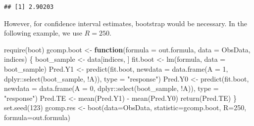 \documentclass[
]{book}
\newenvironment{Shaded}{\begin{snugshade}}{\end{snugshade}}
\newcommand{\AttributeTok}[1]{\textcolor[rgb]{0.77,0.63,0.00}{#1}}
\newcommand{\ControlFlowTok}[1]{\textcolor[rgb]{0.13,0.29,0.53}{\textbf{#1}}}
\newcommand{\DecValTok}[1]{\textcolor[rgb]{0.00,0.00,0.81}{#1}}
\newcommand{\FunctionTok}[1]{\textcolor[rgb]{0.00,0.00,0.00}{#1}}
\newcommand{\NormalTok}[1]{#1}
\newcommand{\OtherTok}[1]{\textcolor[rgb]{0.56,0.35,0.01}{#1}}
\newcommand{\SpecialCharTok}[1]{\textcolor[rgb]{0.00,0.00,0.00}{#1}}
\newcommand{\StringTok}[1]{\textcolor[rgb]{0.31,0.60,0.02}{#1}}
\begin{document}
\begin{Shaded}
\end{Shaded}

\begin{verbatim}
## [1] 2.90203
\end{verbatim}

However, for confidence interval estimates, bootstrap would be necessary. In the following example, we use \(R = 250\).

\begin{Shaded}
\begin{Highlighting}[]
\FunctionTok{require}\NormalTok{(boot)}
\NormalTok{gcomp.boot }\OtherTok{\textless{}{-}} \ControlFlowTok{function}\NormalTok{(}\AttributeTok{formula =}\NormalTok{ out.formula, }\AttributeTok{data =}\NormalTok{ ObsData, indices) \{}
\NormalTok{  boot\_sample }\OtherTok{\textless{}{-}}\NormalTok{ data[indices, ]}
\NormalTok{  fit.boot }\OtherTok{\textless{}{-}} \FunctionTok{lm}\NormalTok{(formula, }\AttributeTok{data =}\NormalTok{ boot\_sample)}
\NormalTok{  Pred.Y1 }\OtherTok{\textless{}{-}} \FunctionTok{predict}\NormalTok{(fit.boot, }
                     \AttributeTok{newdata =} \FunctionTok{data.frame}\NormalTok{(}\AttributeTok{A =} \DecValTok{1}\NormalTok{, }
\NormalTok{                                          dplyr}\SpecialCharTok{::}\FunctionTok{select}\NormalTok{(boot\_sample, }\SpecialCharTok{!}\NormalTok{A)), }
                           \AttributeTok{type =} \StringTok{"response"}\NormalTok{)}
\NormalTok{  Pred.Y0 }\OtherTok{\textless{}{-}} \FunctionTok{predict}\NormalTok{(fit.boot, }
                     \AttributeTok{newdata =} \FunctionTok{data.frame}\NormalTok{(}\AttributeTok{A =} \DecValTok{0}\NormalTok{, }
\NormalTok{                                          dplyr}\SpecialCharTok{::}\FunctionTok{select}\NormalTok{(boot\_sample, }\SpecialCharTok{!}\NormalTok{A)), }
                           \AttributeTok{type =} \StringTok{"response"}\NormalTok{)}
\NormalTok{  Pred.TE }\OtherTok{\textless{}{-}} \FunctionTok{mean}\NormalTok{(Pred.Y1) }\SpecialCharTok{{-}} \FunctionTok{mean}\NormalTok{(Pred.Y0)}
  \FunctionTok{return}\NormalTok{(Pred.TE)}
\NormalTok{\}}
\FunctionTok{set.seed}\NormalTok{(}\DecValTok{123}\NormalTok{)}
\NormalTok{gcomp.res }\OtherTok{\textless{}{-}} \FunctionTok{boot}\NormalTok{(}\AttributeTok{data=}\NormalTok{ObsData, }
                  \AttributeTok{statistic=}\NormalTok{gcomp.boot,}
                  \AttributeTok{R=}\DecValTok{250}\NormalTok{, }
                  \AttributeTok{formula=}\NormalTok{out.formula)}
\end{Highlighting}
\end{Shaded}
\end{document}
